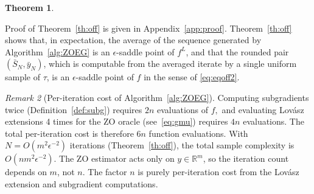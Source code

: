 \documentclass{article}
\theoremstyle{plain}
\newtheorem{theorem}{Theorem}[section]
\theoremstyle{definition}
\theoremstyle{remark}
\newtheorem{remark}[theorem]{Remark}
\begin{document}
\begin{theorem}
\end{theorem}
Proof of Theorem~\ref{th:off} is given in Appendix~\ref{app:proof}.
Theorem~\ref{th:off} shows that, in expectation, the average of the sequence generated by Algorithm~\ref{alg:ZOEG} is an $\epsilon$-saddle point of $f^L$, and that the rounded pair $(\bar{S}_N,\bar{y}_N)$, which is computable from the averaged iterate by a single uniform sample of $\tau$, is an $\epsilon$-saddle point of $f$ in the sense of \eqref{eq:eqoff2}.
\begin{remark}[Per-iteration cost of Algorithm~\ref{alg:ZOEG}]
	Computing subgradients twice (Definition~\ref{def:subg}) requires $2n$ evaluations of $f,$ and
	evaluating Lovász extensions 4 times for the ZO oracle (see~\eqref{eq:gmu}) requires $4n$ evaluations.
	The total per-iteration cost is therefore $6n$ function evaluations.
	With $N = O(m^2 \epsilon^{-2})$ iterations (Theorem~\ref{th:off}),
	the total sample complexity is $O(n m^2 \epsilon^{-2})$.
	The ZO estimator acts only on $y \in \mathbb{R}^m$,
	so the iteration count depends on $m$, not $n$.
	The factor $n$ is purely per-iteration cost from the Lovász extension and subgradient computations.
\end{remark}
\end{document}

